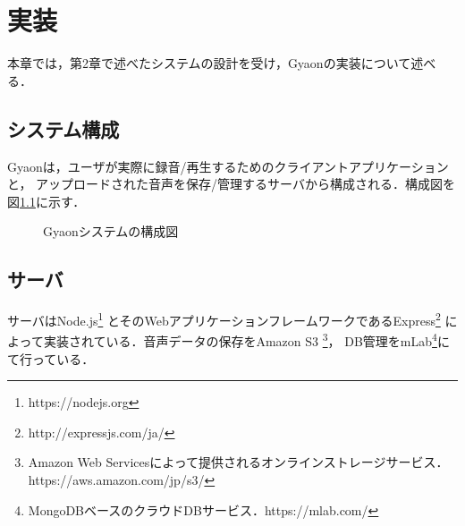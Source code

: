 \chapter{実装}
\label{chap:implementation}

本章では，第2章で述べたシステムの設計を受け，Gyaonの実装について述べる．

\newpage

\section{システム構成}
Gyaonは，ユーザが実際に録音/再生するためのクライアントアプリケーションと，
アップロードされた音声を保存/管理するサーバから構成される．構成図を図\ref{system}に示す．

\begin{figure}[H]
\centering
{}
\caption{Gyaonシステムの構成図}
\label{system}
\end{figure}

\section{サーバ}
サーバはNode.js\footnote{\textsf{https://nodejs.org}}
とそのWebアプリケーションフレームワークであるExpress\footnote{\textsf{http://expressjs.com/ja/}}
によって実装されている．音声データの保存をAmazon S3
\footnote{\textsf{Amazon Web Servicesによって提供されるオンラインストレージサービス．https://aws.amazon.com/jp/s3/}}，
DB管理をmLab\footnote{\textsf{MongoDBベースのクラウドDBサービス．https://mlab.com/}}にて行っている．

